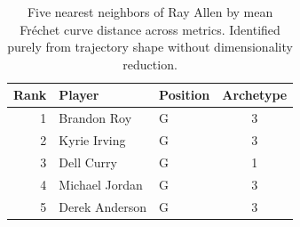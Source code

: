 \begin{table}[htbp]
  \centering\small
  \begin{tabular}{rllc}
    \toprule
    Rank & Player & Position & Archetype \\
    \midrule
    1 & Brandon Roy & G & 3 \\
    2 & Kyrie Irving & G & 3 \\
    3 & Dell Curry & G & 1 \\
    4 & Michael Jordan & G & 3 \\
    5 & Derek Anderson & G & 3 \\
    \bottomrule
  \end{tabular}
  \caption{Five nearest neighbors of Ray Allen by mean Fr\'{e}chet curve distance across metrics. Identified purely from trajectory shape without dimensionality reduction.}
  \label{tab:Ray_Allen_frechet_curve_neighbors}
\end{table}

